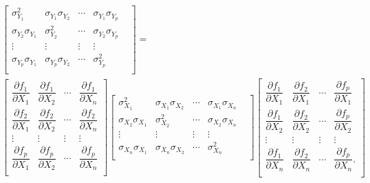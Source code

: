 \documentclass[11pt,a4paper]{article}
\begin{document}
\begin{eqnarray}
& &
\begin{bmatrix}
\sigma_{Y_{1}}^{2} & \sigma_{Y_{1}}\sigma_{Y_{2}} & \cdots & \sigma_{Y_{1}}\sigma_{Y_{p}}\\
\sigma_{Y_{2}}\sigma_{Y_{1}} & \sigma_{Y_{2}}^{2} &  \cdots & \sigma_{Y_{2}}\sigma_{Y_{p}}\\
\vdots & \vdots & \vdots & \vdots \\
\sigma_{Y_{p}}\sigma_{Y_{1}} & \sigma_{Y_{p}}\sigma_{Y_{2}} & \cdots & \sigma_{Y_{p}}^{2} & \\
\end{bmatrix} = \\ \nonumber
& &
\begin{bmatrix}
\dfrac{\partial f_{1}}{\partial X_{1}} & \dfrac{\partial f_{1}}{\partial X_{2}} & \cdots & \dfrac{\partial f_{1}}{\partial X_{n}} \\
\dfrac{\partial f_{2}}{\partial X_{1}} & \dfrac{\partial f_{2}}{\partial X_{2}} & \cdots & \dfrac{\partial f_{2}}{\partial X_{n}} \\
\vdots & \vdots & \vdots & \vdots \\
\dfrac{\partial f_{p}}{\partial X_{1}} & \dfrac{\partial f_{p}}{\partial X_{2}} & \cdots & \dfrac{\partial f_{p}}{\partial X_{n}} \\
\end{bmatrix}
\begin{bmatrix}
\sigma_{X_{1}}^{2} & \sigma_{X_{1}}\sigma_{X_{2}} & \cdots & \sigma_{X_{1}}\sigma_{X_{n}}\\
\sigma_{X_{2}}\sigma_{X_{1}} & \sigma_{X_{2}}^{2} &  \cdots & \sigma_{X_{2}}\sigma_{X_{n}}\\
\vdots & \vdots & \vdots & \vdots \\
\sigma_{X_{n}}\sigma_{X_{1}} & \sigma_{X_{n}}\sigma_{X_{2}} & \cdots & \sigma_{X_{n}}^{2} & \\
\end{bmatrix}
\begin{bmatrix}
\dfrac{\partial f_{1}}{\partial X_{1}} & \dfrac{\partial f_{2}}{\partial X_{1}} & \cdots & \dfrac{\partial f_{p}}{\partial X_{1}} \\
\dfrac{\partial f_{1}}{\partial X_{2}} & \dfrac{\partial f_{2}}{\partial X_{2}} & \cdots & \dfrac{\partial f_{p}}{\partial X_{2}} \\
\vdots & \vdots & \vdots & \vdots \\
\dfrac{\partial f_{1}}{\partial X_{n}} & \dfrac{\partial f_{2}}{\partial X_{n}} &  \cdots & \dfrac{\partial f_{p}}{\partial X_{n}}.\\
\end{bmatrix}
\end{eqnarray}
\end{document}
